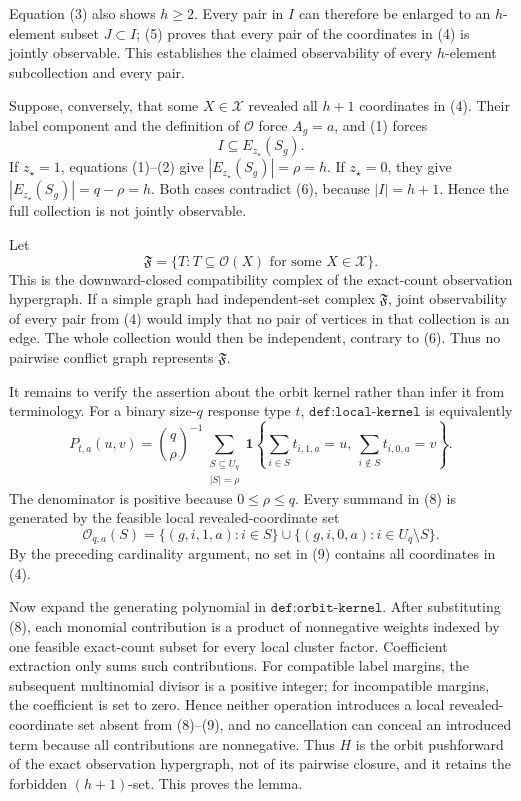 Equation (3) also shows \(h\ge2\).  Every pair in \(I\) can therefore be enlarged to an \(h\)-element subset \(J\subset I\); (5) proves that every pair of the coordinates in (4) is jointly observable.  This establishes the claimed observability of every \(h\)-element subcollection and every pair.

Suppose, conversely, that some \(X\in\mathcal X\) revealed all \(h+1\) coordinates in (4).  Their label component and the definition of \(\mathcal O\) force \(A_g=a\), and (1) forces
\[
 I\subseteq E_{z_\star}(S_g).
 \tag{6}
\]
If \(z_\star=1\), equations (1)--(2) give \(|E_{z_\star}(S_g)|=\rho=h\).  If \(z_\star=0\), they give \(|E_{z_\star}(S_g)|=q-\rho=h\).  Both cases contradict (6), because \(|I|=h+1\).  Hence the full collection is not jointly observable.

Let
\[
 \mathfrak F=\bigl\{T:T\subseteq\mathcal O(X)
                  \text{ for some }X\in\mathcal X\bigr\}.
 \tag{7}
\]
This is the downward-closed compatibility complex of the exact-count observation hypergraph.  If a simple graph had independent-set complex \(\mathfrak F\), joint observability of every pair from (4) would imply that no pair of vertices in that collection is an edge.  The whole collection would then be independent, contrary to (6).  Thus no pairwise conflict graph represents \(\mathfrak F\).

It remains to verify the assertion about the orbit kernel rather than infer it from terminology.  For a binary size-\(q\) response type \(t\), \(\texttt{def:local-kernel}\) is equivalently
\[
 P_{t,a}(u,v)
 =\binom q\rho^{-1}
   \sum_{\substack{S\subseteq U_q\\ |S|=\rho}}
   \mathbf 1\!\left\{
      \sum_{i\in S}t_{i,1,a}=u,
      \ \sum_{i\notin S}t_{i,0,a}=v
   \right\}.
 \tag{8}
\]
The denominator is positive because \(0\le\rho\le q\).  Every summand in (8) is generated by the feasible local revealed-coordinate set
\[
 \mathcal O_{q,a}(S)
 =\{(g,i,1,a):i\in S\}
   \mathbin\cup
   \{(g,i,0,a):i\in U_q\setminus S\}.
 \tag{9}
\]
By the preceding cardinality argument, no set in (9) contains all coordinates in (4).

Now expand the generating polynomial in \(\texttt{def:orbit-kernel}\).  After substituting (8), each monomial contribution is a product of nonnegative weights indexed by one feasible exact-count subset for every local cluster factor.  Coefficient extraction only sums such contributions.  For compatible label margins, the subsequent multinomial divisor is a positive integer; for incompatible margins, the coefficient is set to zero.  Hence neither operation introduces a local revealed-coordinate set absent from (8)--(9), and no cancellation can conceal an introduced term because all contributions are nonnegative.  Thus \(H\) is the orbit pushforward of the exact observation hypergraph, not of its pairwise closure, and it retains the forbidden \((h+1)\)-set.  This proves the lemma.

